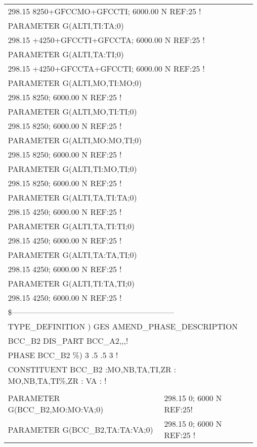 \begin{longtable}[H]{ l l l }
	\multicolumn{3}{l}{298.15 8250+GFCCMO+GFCCTI; 6000.00 N REF:25  !}\\
	PARAMETER G(ALTI,TI:TA;0) & & \\
	\multicolumn{3}{l}{298.15 +4250+GFCCTI+GFCCTA; 6000.00 N REF:25 !}\\
	PARAMETER G(ALTI,TA:TI;0) & & \\
	\multicolumn{3}{l}{298.15 +4250+GFCCTA+GFCCTI; 6000.00 N REF:25 !}\\	 
	PARAMETER G(ALTI,MO,TI:MO;0) & & \\
	\multicolumn{3}{l}{298.15 8250; 6000.00 N REF:25 !}\\
	PARAMETER G(ALTI,MO,TI:TI;0) & & \\
	\multicolumn{3}{l}{298.15 8250; 6000.00 N REF:25 !}\\
	PARAMETER G(ALTI,MO:MO,TI;0) & & \\
	\multicolumn{3}{l}{298.15 8250; 6000.00 N REF:25 !}\\
	PARAMETER G(ALTI,TI:MO,TI;0) & & \\
	\multicolumn{3}{l}{298.15 8250; 6000.00 N REF:25 !}\\
	PARAMETER G(ALTI,TA,TI:TA;0) & & \\
	\multicolumn{3}{l}{298.15 4250; 6000.00 N REF:25 !}\\
	PARAMETER G(ALTI,TA,TI:TI;0) & & \\
	\multicolumn{3}{l}{298.15 4250; 6000.00 N REF:25 !}\\	 
	PARAMETER G(ALTI,TA:TA,TI;0) & & \\
	\multicolumn{3}{l}{298.15 4250; 6000.00 N REF:25 !}\\
	PARAMETER G(ALTI,TI:TA,TI;0) & & \\
	\multicolumn{3}{l}{298.15 4250; 6000.00 N REF:25 !}\\
	\multicolumn{3}{l}{\$--------------------------------------------------------------}\\
	\multicolumn{3}{l}{TYPE\_DEFINITION ) GES AMEND\_PHASE\_DESCRIPTION}\\
	\multicolumn{3}{l}{BCC\_B2 DIS\_PART BCC\_A2,,,!}\\
	\multicolumn{3}{l}{PHASE BCC\_B2  \%)  3 .5   .5   3 !}\\
	\multicolumn{3}{l}{CONSTITUENT BCC\_B2  :MO,NB,TA,TI,ZR : MO,NB,TA,TI\%,ZR : VA :  !}\\
	& & \\
	PARAMETER G(BCC\_B2,MO:MO:VA;0) & \multicolumn{2}{l}{298.15 0; 6000 N REF:25!}\\
	PARAMETER G(BCC\_B2,TA:TA:VA;0) & \multicolumn{2}{l}{298.15 0; 6000 N REF:25 !}\\

\end{longtable}
